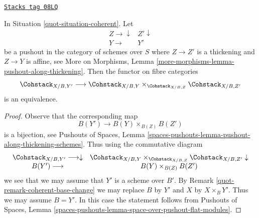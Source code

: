 \begin{lemma}
\label{quot-lemma-coherent-RS-star}
\href{https://stacks.math.columbia.edu/tag/08LQ}{\texttt{Stacks tag 08LQ}}

In Situation \ref{quot-situation-coherent}. Let
$$
\begin{array}{cc}Z \longrightarrow\downarrow & Z' \downarrow \\ Y \longrightarrow & Y'\end{array}
$$
be a pushout in the category of schemes over $S$ where
$Z \to Z'$ is a thickening and $Z \to Y$ is affine, see
More on Morphisms, Lemma \ref{more-morphisms-lemma-pushout-along-thickening}.
Then the functor on fibre categories
$$
\Cohstack_{X/B, Y'}
\longrightarrow
\Cohstack_{X/B, Y} \times_{\Cohstack_{X/B, Z}} \Cohstack_{X/B, Z'}
$$
is an equivalence.
\end{lemma}

\begin{proof}

Observe that the corresponding map
$$
B(Y') \longrightarrow B(Y) \times_{B(Z)} B(Z')
$$
is a bijection, see Pushouts of Spaces, Lemma
\ref{spaces-pushouts-lemma-pushout-along-thickening-schemes}.
Thus using the commutative diagram
$$
\begin{array}{cc}\Cohstack_{X/B, Y'} \longrightarrow\downarrow & \Cohstack_{X/B, Y} \times_{\Cohstack_{X/B, Z}} \Cohstack_{X/B, Z'}
\downarrow \\ B(Y') \longrightarrow & B(Y) \times_{B(Z)} B(Z')\end{array}
$$
we see that we may assume that $Y'$ is a scheme over $B'$. By
Remark \ref{quot-remark-coherent-base-change}
we may replace $B$ by $Y'$ and $X$ by $X \times_B Y'$.
Thus we may assume $B = Y'$. In this case the statement follows from
Pushouts of Spaces, Lemma
\ref{spaces-pushouts-lemma-space-over-pushout-flat-modules}.
\end{proof}

